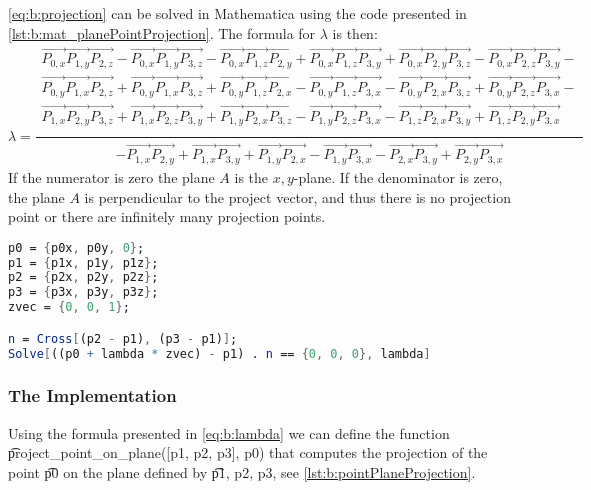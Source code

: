 		\autoref{eq:b:projection} can be solved in Mathematica using the code presented in \autoref{lst:b:mat_planePointProjection}. The formula for $\lambda$ is then:
      		\begin{equation}\label{eq:b:lambda}
      			\lambda = 
				\frac{
					\begin{aligned}
		  				  	\vec{P_{0,x}} \vec{P_{1,y}} \vec{P_{2,z}}-\vec{P_{0,x}} \vec{P_{1,y}} \vec{P_{3,z}}-\vec{P_{0,x}} \vec{P_{1,z}} \vec{P_{2,y}} +\vec{P_{0,x}} \vec{P_{1,z}} \vec{P_{3,y}}+\vec{P_{0,x}} \vec{P_{2,y}} \vec{P_{3,z}}-\vec{P_{0,x}} \vec{P_{2,z}} \vec{P_{3,y}} - \\
		  				  	\vec{P_{0,y}} \vec{P_{1,x}} \vec{P_{2,z}}+\vec{P_{0,y}} \vec{P_{1,x}} \vec{P_{3,z}}+\vec{P_{0,y}} \vec{P_{1,z}} \vec{P_{2,x}} -\vec{P_{0,y}} \vec{P_{1,z}} \vec{P_{3,x}}-\vec{P_{0,y}} \vec{P_{2,x}} \vec{P_{3,z}}+\vec{P_{0,y}} \vec{P_{2,z}} \vec{P_{3,x}} - \\
		  				  	\vec{P_{1,x}} \vec{P_{2,y}} \vec{P_{3,z}}+\vec{P_{1,x}} \vec{P_{2,z}} \vec{P_{3,y}}+\vec{P_{1,y}} \vec{P_{2,x}} \vec{P_{3,z}} -\vec{P_{1,y}} \vec{P_{2,z}} \vec{P_{3,x}}-\vec{P_{1,z}} \vec{P_{2,x}} \vec{P_{3,y}}+\vec{P_{1,z}} \vec{P_{2,y}} \vec{P_{3,x}}~~ \\
		      		\end{aligned}
  				}{
		      		\begin{aligned}
						-\vec{P_{1,x}} \vec{P_{2,y}}+\vec{P_{1,x}} \vec{P_{3,y}}+\vec{P_{1,y}} \vec{P_{2,x}} - \vec{P_{1,y}} \vec{P_{3,x}}-\vec{P_{2,x}} \vec{P_{3,y}}+\vec{P_{2,y}} \vec{P_{3,x}}
					\end{aligned}
		      	}
			\end{equation}
		If the numerator is zero the plane $A$ is the $x,y$-plane. If the denominator is zero, the plane $A$ is perpendicular to the project vector, and thus there is no projection point or there are infinitely many projection points.

	\begin{lstlisting}[float, language=Mathematica, label={lst:b:mat_planePointProjection}, caption={Mathematica code used to solve \autoref{eq:b:projection}.}]
p0 = {p0x, p0y, 0};
p1 = {p1x, p1y, p1z};
p2 = {p2x, p2y, p2z};
p3 = {p3x, p3y, p3z};
zvec = {0, 0, 1};

n = Cross[(p2 - p1), (p3 - p1)];
Solve[((p0 + lambda * zvec) - p1) . n == {0, 0, 0}, lambda]\end{lstlisting}		

	\subsubsection*{The Implementation}
	Using the formula presented in \autoref{eq:b:lambda} we can define the function \t{project_point_on_plane([p1, p2, p3], p0)} that computes the projection of the point \t{p0} on the plane defined by \t{p1, p2, p3}, see \autoref{lst:b:pointPlaneProjection}.

	